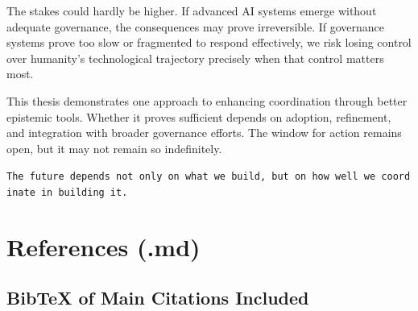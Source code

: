 \documentclass[
  11pt,
  letterpaper,
]{book}
\begin{document}
The stakes could hardly be higher. If advanced AI systems emerge without
adequate governance, the consequences may prove irreversible. If
governance systems prove too slow or fragmented to respond effectively,
we risk losing control over humanity's technological trajectory
precisely when that control matters most.

This thesis demonstrates one approach to enhancing coordination through
better epistemic tools. Whether it proves sufficient depends on
adoption, refinement, and integration with broader governance efforts.
The window for action remains open, but it may not remain so
indefinitely.

\texttt{The\ future\ depends\ not\ only\ on\ what\ we\ build,\ but\ on\ how\ well\ we\ coordinate\ in\ building\ it.}


\chapter{References (.md)}\label{references-.md}

\section{BibTeX of Main Citations
Included}\label{bibtex-of-main-citations-included}
\end{document}
